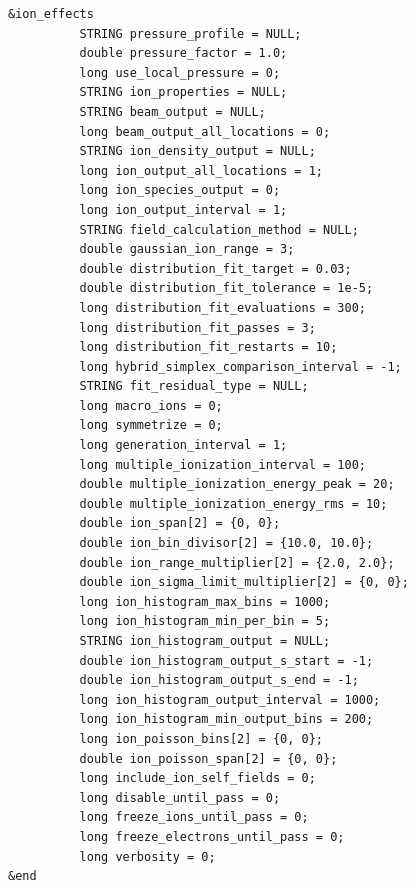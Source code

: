 \documentclass[11pt]{article}
\begin{document}
\begin{verbatim}
&ion_effects
          STRING pressure_profile = NULL;
          double pressure_factor = 1.0;
          long use_local_pressure = 0;
          STRING ion_properties = NULL;
          STRING beam_output = NULL;
          long beam_output_all_locations = 0;
          STRING ion_density_output = NULL;
          long ion_output_all_locations = 1;
          long ion_species_output = 0;
          long ion_output_interval = 1;	
          STRING field_calculation_method = NULL;
          double gaussian_ion_range = 3;
          double distribution_fit_target = 0.03;
          double distribution_fit_tolerance = 1e-5;
          long distribution_fit_evaluations = 300;
          long distribution_fit_passes = 3;
          long distribution_fit_restarts = 10;
          long hybrid_simplex_comparison_interval = -1;
          STRING fit_residual_type = NULL;
          long macro_ions = 0;
          long symmetrize = 0;
          long generation_interval = 1;
          long multiple_ionization_interval = 100;
          double multiple_ionization_energy_peak = 20;
          double multiple_ionization_energy_rms = 10;
          double ion_span[2] = {0, 0};
          double ion_bin_divisor[2] = {10.0, 10.0};
          double ion_range_multiplier[2] = {2.0, 2.0};
          double ion_sigma_limit_multiplier[2] = {0, 0};
          long ion_histogram_max_bins = 1000;
          long ion_histogram_min_per_bin = 5;
          STRING ion_histogram_output = NULL;
          double ion_histogram_output_s_start = -1;
          double ion_histogram_output_s_end = -1;
          long ion_histogram_output_interval = 1000;
          long ion_histogram_min_output_bins = 200;
          long ion_poisson_bins[2] = {0, 0};
          double ion_poisson_span[2] = {0, 0};
          long include_ion_self_fields = 0;
          long disable_until_pass = 0;
          long freeze_ions_until_pass = 0;
          long freeze_electrons_until_pass = 0;
          long verbosity = 0;
&end
\end{verbatim}
\end{document}
